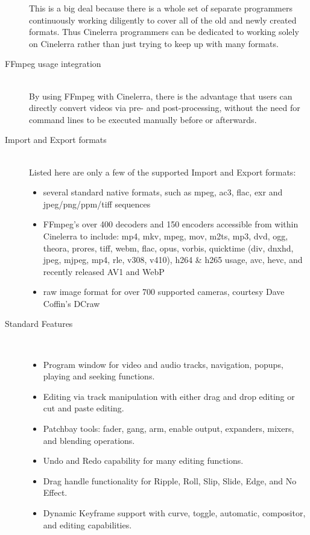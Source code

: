 \begin{description}
        This is a big deal because there is a whole set of separate programmers continuously working diligently to cover all of the old and newly created formats. 
        Thus Cinelerra programmers can be dedicated to working solely on Cinelerra rather than just trying to keep up with many formats.
    \item[FFmpeg usage integration]~\\
        By using FFmpeg with Cinelerra, there is the advantage that users can directly convert videos via pre- and post-processing, without the need for command lines to be executed manually before or afterwards.
    \item[Import and Export formats] ~\\
        Listed here are only a few of the supported Import and Export formats:
        \begin{itemize}
            \item  several standard native formats, such as mpeg, ac3, flac, exr and jpeg/png/ppm/tiff sequences
            \item FFmpeg’s over 400 decoders and 150 encoders accessible from within Cinelerra to include:
                mp4, mkv, mpeg, mov, m2ts, mp3, dvd, ogg, theora, prores, tiff, webm, flac, opus, vorbis,
                quicktime (div, dnxhd, jpeg, mjpeg, mp4, rle, v308, v410), h264 \& h265 usage, avc, hevc,
                and recently released AV1 and WebP
            \item raw image format for over 700 supported cameras, courtesy Dave Coffin's DCraw
        \end{itemize}
        \item[Standard Features] ~\\
            \begin{itemize}
                \item Program window for video and audio tracks, navigation, popups, playing and seeking functions.
                \item Editing via track manipulation with either drag and drop editing or cut and paste editing.
                \item  Patchbay tools: fader, gang, arm, enable output, expanders, mixers, and blending operations.
                \item Undo and Redo capability for many editing functions.
                \item Drag handle functionality for Ripple, Roll, Slip, Slide, Edge, and No Effect.
                \item Dynamic Keyframe support with curve, toggle, automatic, compositor, and editing capabilities.

\end{itemize}
\end{description}
